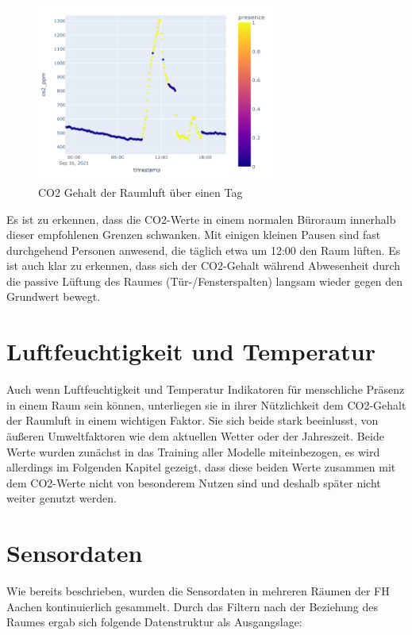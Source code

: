 \begin{figure}[h]
    \centering
    \includegraphics[width=0.7\textwidth]{pic/co2_singleDay.png}
    \caption{CO2 Gehalt der Raumluft über einen Tag}
    \label{fig:CO2_oneDay}
\end{figure}
 
Es ist zu erkennen, dass die CO2-Werte in einem normalen Büroraum innerhalb dieser empfohlenen Grenzen schwanken.
Mit einigen kleinen Pausen sind fast durchgehend Personen anwesend, die täglich etwa um 12:00 den Raum lüften.
Es ist auch klar zu erkennen, dass sich der CO2-Gehalt während Abwesenheit durch die passive Lüftung des Raumes  
(Tür-/Fensterspalten) langsam wieder gegen den Grundwert bewegt.

\section{Luftfeuchtigkeit und Temperatur}
Auch wenn Luftfeuchtigkeit und Temperatur Indikatoren für menschliche Präsenz in einem Raum sein können, 
unterliegen sie in ihrer Nützlichkeit dem CO2-Gehalt der Raumluft in einem wichtigen Faktor. 
Sie sich beide stark beeinlusst, von äußeren Umweltfaktoren wie dem aktuellen Wetter oder der Jahreszeit.
Beide Werte wurden zunächst in das Training aller Modelle miteinbezogen, es wird allerdings im Folgenden 
Kapitel gezeigt, dass diese beiden Werte zusammen mit dem CO2-Werte nicht von besonderem Nutzen sind und 
deshalb später nicht weiter genutzt werden.  

\section{Sensordaten}
Wie bereits beschrieben, wurden die Sensordaten in mehreren Räumen der FH Aachen kontinuierlich 
gesammelt. Durch das Filtern nach der Beziehung des Raumes ergab sich folgende Datenstruktur als
Ausgangslage:\\

